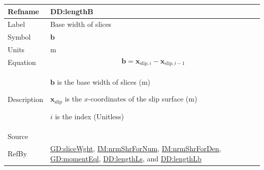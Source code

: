 \documentclass[12pt]{article}
\begin{document}
\medskip
\noindent
\begin{minipage}{\textwidth}
\begin{tabular}{>{\raggedright}p{}>{\raggedright\arraybackslash}p{}}
\toprule \textbf{Refname} & \textbf{DD:lengthB}
\label{DD:lengthB}
\\ \midrule
Label & Base width of slices
        
\\ \midrule
Symbol & $\symbf{b}$
         
\\ \midrule
Units & ${\text{m}}$
        
\\ \midrule
Equation & \begin{displaymath}
           \symbf{b}={\symbf{x}_{\text{slip},i}}-{\symbf{x}_{\text{slip},i-1}}
           \end{displaymath}
\\ \midrule
Description & \begin{symbDescription}
              \item{$\symbf{b}$ is the base width of slices (${\text{m}}$)}
              \item{${\symbf{x}_{\text{slip}}}$ is the $x$-coordinates of the slip surface (${\text{m}}$)}
              \item{$i$ is the index (Unitless)}
              \end{symbDescription}
\\ \midrule
Source & \cite{fredlund1977}
         
\\ \midrule
RefBy & \hyperref[GD:sliceWght]{GD:sliceWght}, \hyperref[IM:nrmShrForNum]{IM:nrmShrForNum}, \hyperref[IM:nrmShrForDen]{IM:nrmShrForDen}, \hyperref[GD:momentEql]{GD:momentEql}, \hyperref[DD:lengthLs]{DD:lengthLs}, and \hyperref[DD:lengthLb]{DD:lengthLb}
        
\\ \bottomrule
\end{tabular}
\end{minipage}
\end{document}
